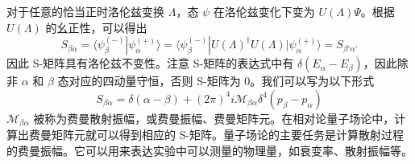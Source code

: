 对于任意的恰当正时洛伦兹变换 $\Lambda$，态 $\psi$ 在洛伦兹变化下变为 $U(\Lambda)\Psi$。根据 $U(\Lambda)$ 的幺正性，可以得出
\begin{equation}
S_{\beta\alpha}=\langle \psi_\beta^{(-)}| \psi_\alpha^{(+)} \rangle=\langle \psi_\beta^{(-)}| U(\Lambda)^\dagger U(\Lambda) |\psi_\alpha^{(+)} \rangle=S_{\beta'\alpha'}
\end{equation}
因此 S-矩阵具有洛伦兹不变性。注意 S-矩阵的表达式中有 $\delta(E_\alpha-E_\beta)$，因此除非 $\alpha$ 和 $\beta$ 态对应的四动量守恒，否则 S-矩阵为 $0$。我们可以写为以下形式
\begin{equation}
S_{\beta\alpha}=\delta(\alpha-\beta)+(2\pi)^4 i \mathcal{M}_{\beta\alpha}\delta^4(p_\beta-p_\alpha)
\end{equation}
$\mathcal{M}_{\beta\alpha}$ 被称为费曼散射振幅，或费曼振幅、费曼矩阵元。在相对论量子场论中，计算出费曼矩阵元就可以得到相应的 S-矩阵。量子场论的主要任务是计算散射过程的费曼振幅。它可以用来表达实验中可以测量的物理量，如衰变率、散射振幅等。
